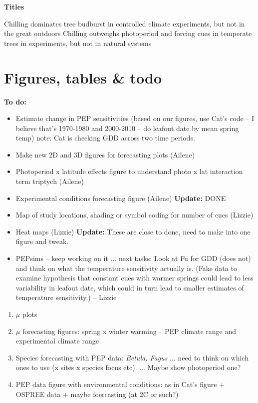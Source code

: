 \documentclass[11pt,letter]{article}
\begin{document}
%
 
\renewcommand{\refname}{\CHead{}}


{\bf Titles}

Chilling dominates tree budburst in controlled climate experiments, but not in the great outdoors
Chilling outweighs photoperiod and forcing cues in temperate trees in experiments, but not in natural systems



\section{Figures, tables \& todo}

{\bf To do:}
\begin{itemize}
\item Estimate change in PEP sensitivities (based on our figures, use Cat's code -- I believe that's 1970-1980 and 2000-2010 -- do leafout date by mean spring temp)
note: Cat is checking GDD across two time periods.
\item Make new 2D and 3D figures for forecasting plots (Ailene)
\item Photoperiod x latitude effects figure to understand photo x lat interaction term  triptych (Ailene)
\item Experimental conditions forecasting figure (Ailene) {\bf Update:}  DONE
\item Map of study locations, shading or symbol coding for number of cues (Lizzie)
\item Heat maps (Lizzie) {\bf Update:} These are close to done, need to make into one figure and tweak. 
\item PEPsims -- keep working on it ... next tasks: Look at Fu for GDD (does not) and think on what the temperature sensitivity actually is. (Fake data to examine hypothesis that constant cues with warmer springs could lead to less variability in leafout date, which could in turn lead to smaller estimates of temperature sensitivity.) -- Lizzie
\end{itemize}





\begin{enumerate}
\item $\mu$ plots
\item  $\mu$ forecasting figures: spring x winter warming -- PEP climate range and experimental climate range
\item Species forecasting with PEP data: \emph{Betula, Fagus} ... need to think on which ones to use (x sites x species focus etc). ... Maybe show photoperiod one?
\item PEP data figure with environmental conditions: as in Cat's figure + OSPREE data + maybe foercasting (at 2C or such?)
\end{enumerate}
\end{document}
